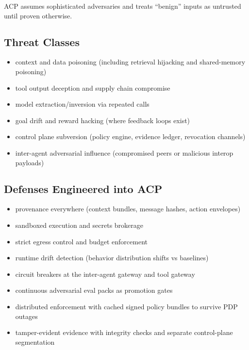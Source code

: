 \documentclass[11pt]{article}
\begin{document}
ACP assumes sophisticated adversaries and treats ``benign'' inputs as
untrusted until proven otherwise.

\hypertarget{threat-classes}{%
\subsection{Threat Classes}\label{threat-classes}}

\begin{itemize}
\tightlist
\item
  context and data poisoning (including retrieval hijacking and
  shared-memory poisoning)
\item
  tool output deception and supply chain compromise
\item
  model extraction/inversion via repeated calls
\item
  goal drift and reward hacking (where feedback loops exist)
\item
  control plane subversion (policy engine, evidence ledger, revocation
  channels)
\item
  inter-agent adversarial influence (compromised peers or malicious
  interop payloads)
\end{itemize}

\hypertarget{defenses-engineered-into-acp}{%
\subsection{Defenses Engineered into ACP}\label{defenses-engineered-into-acp}}

\begin{itemize}
\tightlist
\item
  provenance everywhere (context bundles, message hashes, action
  envelopes)
\item
  sandboxed execution and secrets brokerage
\item
  strict egress control and budget enforcement
\item
  runtime drift detection (behavior distribution shifts vs baselines)
\item
  circuit breakers at the inter-agent gateway and tool gateway
\item
  continuous adversarial eval packs as promotion gates
\item
  distributed enforcement with cached signed policy bundles to survive
  PDP outages
\item
  tamper-evident evidence with integrity checks and separate
  control-plane segmentation
\end{itemize}
\end{document}
